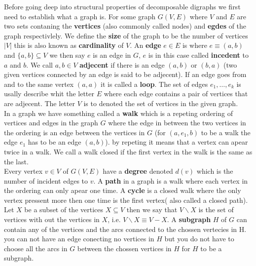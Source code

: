Before going deep into structural properties of decomposable digraphs we first need to establish what a graph is.
For some graph $G(V,E)$ where $V$ and $E$ are two sets contaning the \textbf{vertices} (also commonly called nodes) and \textbf{egdes} of the graph respectivlely.
We define the \textbf{size} of the graph to be the number of vertices $|V|$ this is also known as \textbf{cardinality} of $V$.
An \textbf{edge} $e \in E$ is where $e \equiv (a, b)$ and $\{ a, b \} \subseteq V$ we then say $e$ is an edge in $G$, $e$ is in this case called \textbf{incedent} to $a$ and $b$. 
We call $a,b \in V$ \textbf{adjecent} if there is an edge $(a,b)$ or $(b,a)$ (two given vertices connected by an edge is said to be adjecent).
If an edge goes from and to the same vertex $(a,a)$ it is called a \textbf{loop}.
The set of edges $e_1, \dots, e_k$ is usally describe whit the letter $E$ where each edge contains a pair of vertices that are adjecent. The letter $V$ is to denoted the set of vertices in the given graph. \\
In a graph we have something called a \textbf{walk} which is a repeting ordering of vertices and edges in the graph $G$ where the edge in between the two vertices in the ordering is an edge between the vertices in $G$ (for $(a,e_1,b)$ to be a walk the edge $e_1$ has to be an edge $(a,b)$). by repeting it means that a vertex can apear twice in a walk.
We call a walk closed if the first vertex in the walk is the same as the last.\\
Every vertex $v\in V$ of $G(V,E)$ have a \textbf{degree} denoted $d(v)$ which is the number of incident edges to $v$.
A \textbf{path} in a graph is a walk where each vertex in the ordering can only apear one time. 
A \textbf{cycle} is a closed walk where the only vertex pressent more then one time is the first vertex( also called a closed path). 
Let $X$ be a subset of the vertices $X\subseteq V$ then we say that $V\backslash X$ is the set of vertices with out the vertices in $X$, i.e. $V\backslash X \equiv V-X$. 
A \textbf{subgraph} $H$ of $G$ can contain any of the vertices and the arcs connected to the chossen vertecies in H. 
you can not have an edge conecting no vertices in $H$ but you do not have to choose all the arcs in $G$ between the chossen vertices in $H$ for $H$ to be a subgraph. \\
